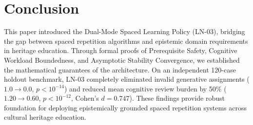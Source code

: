 \documentclass[11pt,a4paper]{article}
\begin{document}
\section{Conclusion}
\label{sec:conclusion}

This paper introduced the Dual-Mode Spaced Learning Policy (LN-03), bridging the gap between spaced repetition algorithms and epistemic domain requirements in heritage education. Through formal proofs of Prerequisite Safety, Cognitive Workload Boundedness, and Asymptotic Stability Convergence, we established the mathematical guarantees of the architecture. On an independent 120-case holdout benchmark, LN-03 completely eliminated invalid generative assignments ($1.0 \to 0.0$, $p < 10^{-14}$) and reduced mean cognitive review burden by 50\% ($1.20 \to 0.60$, $p < 10^{-12}$, Cohen's $d = 0.747$). These findings provide robust foundation for deploying epistemically grounded spaced repetition systems across cultural heritage education.
\end{document}
